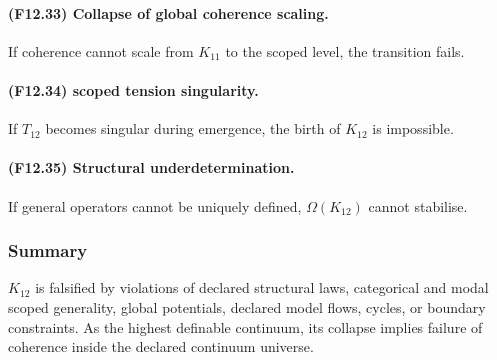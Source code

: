 \paragraph{(F12.33) Collapse of global coherence scaling.}
If coherence cannot scale from $K_{11}$ to the scoped level,
the transition fails.

\paragraph{(F12.34) scoped tension singularity.}
If $T_{12}$ becomes singular during emergence,
the birth of $K_{12}$ is impossible.

\paragraph{(F12.35) Structural underdetermination.}
If general operators cannot be uniquely defined,
$\Omega(K_{12})$ cannot stabilise.



\subsubsection{Summary}

$K_{12}$ is falsified by violations of declared structural laws,
categorical and modal scoped generality, global potentials, declared model flows,
cycles, or boundary constraints. As the highest definable continuum,
its collapse implies failure of coherence inside the declared continuum universe.
